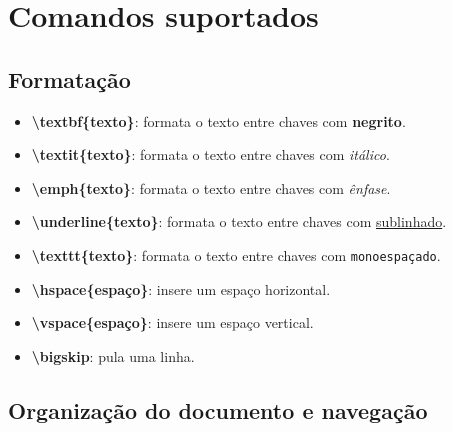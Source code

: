 

\newcommand{\com}[1]{\textbf{\backslash#1}}
\newcommand{\comp}[2]{\textbf{\backslash#1\{#2\}}}
\newcommand{\compp}[3]{\textbf{\backslash#1\{#2\}\{#3\}}}
\newcommand{\comop}[3]{\textbf{\backslash#1[#2]\{#3\}}}

\section{Comandos suportados}

\subsection{Formatação}

\begin{itemize}
    \item \comp{textbf}{texto}: formata o texto entre chaves com \textbf{negrito}.
    \item \comp{textit}{texto}: formata o texto entre chaves com \textit{itálico}.
    \item \comp{emph}{texto}: formata o texto entre chaves com \emph{ênfase}.
    \item \comp{underline}{texto}: formata o texto entre chaves com \underline{sublinhado}.
    \item \comp{texttt}{texto}: formata o texto entre chaves com \texttt{monoespaçado}.
    \item \comp{hspace}{espaço}: insere um espaço horizontal.
    \item \comp{vspace}{espaço}: insere um espaço vertical.
    \item \com{bigskip}: pula uma linha.
\end{itemize}

\subsection{Organização do documento e navegação}

